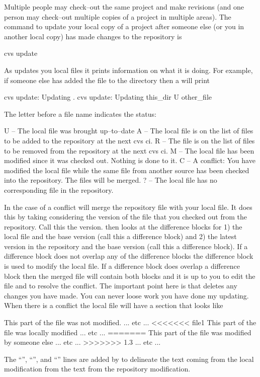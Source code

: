 Multiple people may check--out the same project and make revisions
(and one person may check--out multiple copies of a project in
multiple areas). The command to update your local copy of a project
after someone else (or you in another local copy) has made changes to
the repository is
\begin{example}
  cvs update
\end{example}
As \cvs updates you local files it prints information on what it is
doing. For example, if someone else has added the file 
to the  directory then a  will print
\begin{example}
  cvs update: Updating .
  cvs update: Updating this_dir
  U other_file
\end{example}
The letter before a file name indicates the status:
\begin{example}
  U -- The local file was brought up--to--date
  A -- The local file is on the list of files to be added to the repository
          at the next cvs ci.
  R -- The file is on the list of files to be removed from the repository
          at the next cvs ci.
  M -- The local file has been modified since it was checked out. 
          Nothing is done to it.
  C -- A conflict: You have modified the local file while the same file
          from another source has been checked into the repository.
          The files will be merged.
  ? -- The local file has no corresponding file in the repository.
\end{example}
In the case of a conflict \cvs will merge the repository file with
your local file. It does this by taking considering the version of the
file that you checked out from the repository. Call this the 
version. \cvs then looks at the difference blocks for 1) the local
file and the base version (call this a  difference block)
and 2) the latest version in the repository and the base version (call
this a  difference block). If a 
difference block does not overlap any of the  difference
blocks the difference block is used to modify the local file. If a
 difference block does overlap a  difference
block then the merged file will contain both blocks and it is up to
you to edit the file and to resolve the conflict. The important point
here is that  deletes any changes you have made. You
can never loose work you have done my updating. When there is a
conflict the local file will have a section that looks like
\begin{example}
  This part of the file was not modified.
  ... etc ...
  <<<<<<< file1
  This part of the file was locally modified
  ... etc ...
  =======
  This part of the file was modified by someone else
  ... etc ...
  >>>>>>> 1.3
  ... etc ...
\end{example}
The ``'', ``\vn{=======}'', and ``''
lines are added by \cvs to delineate the text coming from the local
modification from the text from the repository modification.

